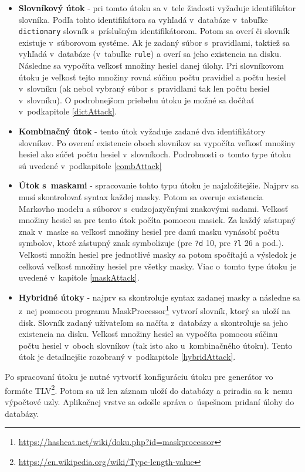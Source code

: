\documentclass[zadani,slovak]{fitthesis}
\begin{document}
\begin{itemize}
    \item \textbf{Slovníkový útok} - pri tomto útoku sa v~tele žiadosti vyžaduje identifikátor slovníka. Podľa tohto identifikátora sa vyhľadá v~databáze v~tabuľke \texttt{dictionary} slovník s~príslušným identifikátorom. Potom sa overí či slovník existuje v~súborovom systéme. Ak je zadaný súbor s~pravidlami, taktiež sa vyhľadá v~databáze (v~tabuľke \texttt{rule}) a overí sa jeho existencia na disku. Následne sa vypočíta veľkosť množiny hesiel danej úlohy. Pri slovníkovom útoku je veľkosť tejto množiny rovná súčinu počtu pravidiel a počtu hesiel v~slovníku (ak nebol vybraný súbor s~pravidlami tak len počtu hesiel v~slovníku). O podrobnejšom priebehu útoku je možné sa dočítať v~podkapitole \ref{dictAttack}.
    \item \textbf{Kombinačný útok} - tento útok vyžaduje zadané dva identifikátory slovníkov. Po overení existencie oboch slovníkov sa vypočíta veľkosť množiny hesiel ako súčet počtu hesiel v~slovníkoch. Podrobnosti o~tomto type útoku sú uvedené v~podkapitole \ref{combAttack}
    \item \textbf{Útok s~maskami} - spracovanie tohto typu útoku je najzložitejšie. Najprv sa musí skontrolovať syntax každej masky. Potom sa overuje existencia Markovho modelu a súborov s~cudzojazyčnými znakovými sadami. Veľkosť množiny hesiel sa pre tento útok počíta pomocou masiek. Za každý zástupný znak v~maske sa veľkosť množiny hesiel pre danú masku vynásobí počtu symbolov, ktoré zástupný znak symbolizuje (pre \texttt{?d} 10, pre \texttt{?l} 26 a pod.). Veľkosti množín hesiel pre jednotlivé masky sa potom spočítajú a výsledok je celková veľkosť množiny hesiel pre všetky masky. Viac o~tomto type útoku je uvedené v~kapitole \ref{maskAttack}.
    \item \textbf{Hybridné útoky} - najprv sa skontroluje syntax zadanej masky a následne sa z~nej pomocou programu MaskProcessor\footnote{\url{https://hashcat.net/wiki/doku.php?id=maskprocessor}} vytvorí slovník, ktorý sa uloží na disk. Slovník zadaný užívateľom sa načíta z~databázy a skontroluje sa jeho existencia na disku. Veľkosť množiny hesiel sa vypočíta pomocou súčinu počtu hesiel v~oboch slovníkov (tak isto ako u~kombinačného útoku). Tento útok je detailnejšie rozobraný v~podkapitole \ref{hybridAttack}.
\end{itemize}
Po spracovaní útoku je nutné vytvoriť konfiguráciu útoku pre generátor vo formáte TLV\footnote{\url{https://en.wikipedia.org/wiki/Type-length-value}}. Potom sa už len záznam uloží do databázy a priradia sa k~nemu výpočtové uzly. Aplikačnej vrstve sa odošle správa o~úspešnom pridaní úlohy do databázy.
\end{document}
